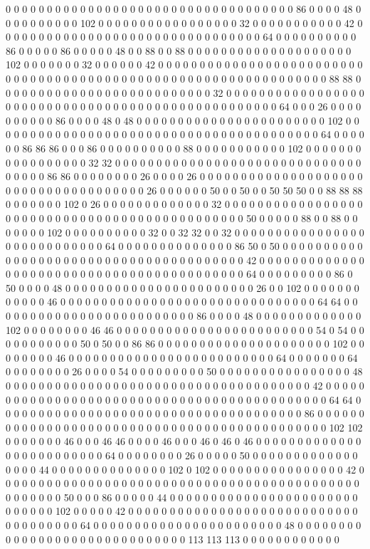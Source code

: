 0 0 0 0 0 0 0 0 0 0 0 0 0 0 0 0 0 0 0 0 0 0 0 0 0 0 0 0 0 0 0 0 0 0 0 86 0 0 0 0 48 0 0 0 0 0 0 0 0 0 0 102 0 0 0 0 0 0 0 0 0 0 0 0 0 0 0 0 0 32 0 0 0 0 0 0 0 0 0 0 0 42 0 0 0 0 0 0 0 0 0 0 0 0 0 0 0 0 0 0 0 0 0 0 0 0 0 0 0 0 0 0 0 0 64 0 0 0 0 0 0 0 0 0 0 86 0 0 0 0 0 86 0 0 0 0 0 48 0 0 88 0 0 88 0 0 0 0 0 0 0 0 0 0 0 0 0 0 0 0 0 0 0 0 102 0 0 0 0 0 0 0 32 0 0 0 0 0 0 42 0 0 0 0 0 0 0 0 0 0 0 0 0 0 0 0 0 0 0 0 0 0 0 0 0 0 0 0 0 0 0 0 0 0 0 0 0 0 0 0 0 0 0 0 0 0 0 0 0 0 0 0 0 0 0 0 0 0 0 0 0 0 0 0 88 88 0 0 0 0 0 0 0 0 0 0 0 0 0 0 0 0 0 0 0 0 0 0 0 0 0 0 32 0 0 0 0 0 0 0 0 0 0 0 0 0 0 0 0 0 0 0 0 0 0 0 0 0 0 0 0 0 0 0 0 0 0 0 0 0 0 0 0 0 0 0 0 0 0 0 0 0 0 64 0 0 0 26 0 0 0 0 0 0 0 0 0 0 86 0 0 0 0 48 0 48 0 0 0 0 0 0 0 0 0 0 0 0 0 0 0 0 0 0 0 0 0 0 0 102 0 0 0 0 0 0 0 0 0 0 0 0 0 0 0 0 0 0 0 0 0 0 0 0 0 0 0 0 0 0 0 0 0 0 0 0 0 0 0 0 64 0 0 0 0 0 0 86 86 86 0 0 0 86 0 0 0 0 0 0 0 0 0 0 88 0 0 0 0 0 0 0 0 0 0 0 102 0 0 0 0 0 0 0 0 0 0 0 0 0 0 0 0 0 32 32 0 0 0 0 0 0 0 0 0 0 0 0 0 0 0 0 0 0 0 0 0 0 0 0 0 0 0 0 0 0 0 0 0 0 0 86 86 0 0 0 0 0 0 0 0 26 0 0 0 0 26 0 0 0 0 0 0 0 0 0 0 0 0 0 0 0 0 0 0 0 0 0 0 0 0 0 0 0 0 0 0 0 0 0 0 0 0 0 26 0 0 0 0 0 0 50 0 0 50 0 0 50 50 50 0 0 88 88 88 0 0 0 0 0 0 0 102 0 26 0 0 0 0 0 0 0 0 0 0 0 0 0 32 0 0 0 0 0 0 0 0 0 0 0 0 0 0 0 0 0 0 0 0 0 0 0 0 0 0 0 0 0 0 0 0 0 0 0 0 0 0 0 0 0 0 0 0 0 0 50 0 0 0 0 0 88 0 0 88 0 0 0 0 0 0 0 102 0 0 0 0 0 0 0 0 0 0 32 0 0 32 32 0 0 32 0 0 0 0 0 0 0 0 0 0 0 0 0 0 0 0 0 0 0 0 0 0 0 0 0 0 0 0 64 0 0 0 0 0 0 0 0 0 0 0 0 0 0 86 50 0 50 0 0 0 0 0 0 0 0 0 0 0 0 0 0 0 0 0 0 0 0 0 0 0 0 0 0 0 0 0 0 0 0 0 0 0 0 0 0 0 42 0 0 0 0 0 0 0 0 0 0 0 0 0 0 0 0 0 0 0 0 0 0 0 0 0 0 0 0 0 0 0 0 0 0 0 0 0 0 0 0 0 0 64 0 0 0 0 0 0 0 0 0 86 0 50 0 0 0 0 48 0 0 0 0 0 0 0 0 0 0 0 0 0 0 0 0 0 0 0 0 0 0 0 26 0 0 102 0 0 0 0 0 0 0 0 0 0 0 0 46 0 0 0 0 0 0 0 0 0 0 0 0 0 0 0 0 0 0 0 0 0 0 0 0 0 0 0 0 0 0 0 64 64 0 0 0 0 0 0 0 0 0 0 0 0 0 0 0 0 0 0 0 0 0 0 0 0 0 86 0 0 0 0 48 0 0 0 0 0 0 0 0 0 0 0 0 0 102 0 0 0 0 0 0 0 0 46 46 0 0 0 0 0 0 0 0 0 0 0 0 0 0 0 0 0 0 0 0 0 0 0 0 54 0 54 0 0 0 0 0 0 0 0 0 0 0 50 0 50 0 0 86 86 0 0 0 0 0 0 0 0 0 0 0 0 0 0 0 0 0 0 0 0 0 102 0 0 0 0 0 0 0 0 46 0 0 0 0 0 0 0 0 0 0 0 0 0 0 0 0 0 0 0 0 0 0 0 0 0 64 0 0 0 0 0 0 0 64 0 0 0 0 0 0 0 0 26 0 0 0 0 54 0 0 0 0 0 0 0 0 0 50 0 0 0 0 0 0 0 0 0 0 0 0 0 0 0 0 48 0 0 0 0 0 0 0 0 0 0 0 0 0 0 0 0 0 0 0 0 0 0 0 0 0 0 0 0 0 0 0 0 0 0 0 0 0 42 0 0 0 0 0 0 0 0 0 0 0 0 0 0 0 0 0 0 0 0 0 0 0 0 0 0 0 0 0 0 0 0 0 0 0 0 0 0 0 0 0 0 0 0 64 64 0 0 0 0 0 0 0 0 0 0 0 0 0 0 0 0 0 0 0 0 0 0 0 0 0 0 0 0 0 0 0 0 0 0 0 0 0 86 0 0 0 0 0 0 0 0 0 0 0 0 0 0 0 0 0 0 0 0 0 0 0 0 0 0 0 0 0 0 0 0 0 0 0 0 0 0 0 0 0 0 0 0 0 102 102 0 0 0 0 0 0 0 46 0 0 0 46 46 0 0 0 0 46 0 0 0 46 0 46 0 46 0 0 0 0 0 0 0 0 0 0 0 0 0 0 0 0 0 0 0 0 0 0 0 0 0 64 0 0 0 0 0 0 0 0 26 0 0 0 0 0 50 0 0 0 0 0 0 0 0 0 0 0 0 0 0 0 0 0 44 0 0 0 0 0 0 0 0 0 0 0 0 0 0 102 0 102 0 0 0 0 0 0 0 0 0 0 0 0 0 0 0 0 42 0 0 0 0 0 0 0 0 0 0 0 0 0 0 0 0 0 0 0 0 0 0 0 0 0 0 0 0 0 0 0 0 0 0 0 0 0 0 0 0 0 0 0 0 0 0 0 0 0 0 0 50 0 0 0 86 0 0 0 0 0 44 0 0 0 0 0 0 0 0 0 0 0 0 0 0 0 0 0 0 0 0 0 0 0 0 0 0 0 0 0 102 0 0 0 0 0 42 0 0 0 0 0 0 0 0 0 0 0 0 0 0 0 0 0 0 0 0 0 0 0 0 0 0 0 0 0 0 0 0 0 0 0 0 0 64 0 0 0 0 0 0 0 0 0 0 0 0 0 0 0 0 0 0 0 0 0 0 0 48 0 0 0 0 0 0 0 0 0 0 0 0 0 0 0 0 0 0 0 0 0 0 0 0 0 0 0 0 0 0 113 113 113 0 0 0 0 0 0 0 0 0 0 0 0 
